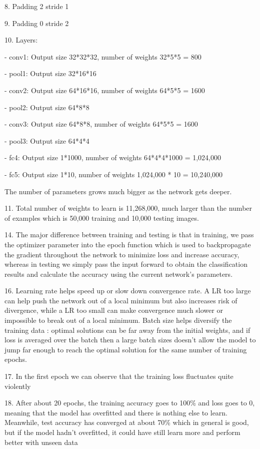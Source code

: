 8. Padding 2 stride 1

9. Padding 0 stride 2

10. Layers:

- conv1: Output size 32*32*32, number of weights 32*5*5 = 800

- pool1: Output size 32*16*16

- conv2: Output size 64*16*16, number of weights 64*5*5 = 1600

- pool2: Output size 64*8*8

- conv3: Output size 64*8*8, number of weights 64*5*5 = 1600

- pool3: Output size 64*4*4

- fc4: Output size 1*1000, number of weights 64*4*4*1000 = 1,024,000

- fc5: Output size 1*10, number of weights 1,024,000 * 10 = 10,240,000

The number of parameters grows much bigger as the network gets deeper.

11. Total number of weights to learn is 11,268,000, much larger than the number of examples which is 50,000 training and 10,000 testing images.

14. The major difference between training and testing is that in training, we pass the optimizer parameter into the epoch function which is used to backpropagate the gradient throughout the network to minimize loss and increase accuracy, whereas in testing we simply pass the input forward to obtain the classification results and calculate the accuracy using the current network's parameters.

16. Learning rate helps speed up or slow down convergence rate. A LR too large can help push the network out of a local minimum but also increases risk of divergence, while a LR too small can make convergence much slower or impossible to break out of a local minimum. Batch size helps diversify the training data : optimal solutions can be far away from the initial weights, and if loss is averaged over the batch then a large batch sizes doesn't allow the model to jump far enough to reach the optimal solution for the same number of training epochs.

17. In the first epoch we can observe that the training loss fluctuates quite violently 

18. After about 20 epochs, the training accuracy goes to 100\% and loss goes to 0, meaning that the model has overfitted and there is nothing else to learn. Meanwhile, test accuracy has converged at about 70\% which in general is good, but if the model hadn't overfitted, it could have still learn more and perform better with unseen data



